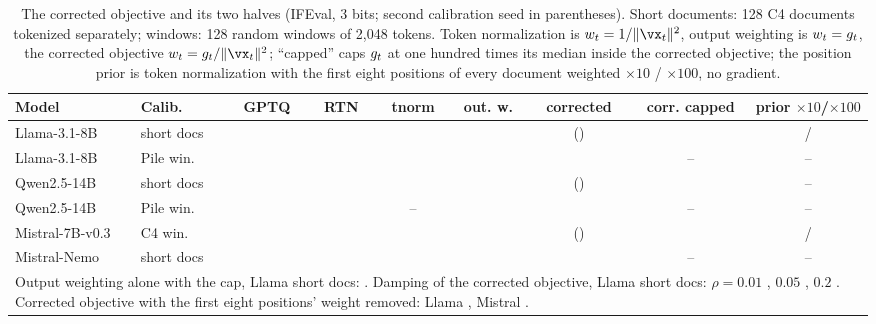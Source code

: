 \begin{table}[htbp]
\caption{The corrected objective and its two halves (IFEval, 3 bits; second calibration seed in parentheses). Short documents: 128 C4 documents tokenized separately; windows: 128 random windows of 2,048 tokens. Token normalization is $\wtok=1/\|\vx_t\|^2$, output weighting is $w_t=g_t$, the corrected objective $\wtok=\gsens/\|\vx_t\|^2$; ``capped'' caps $g_t$ at one hundred times its median inside the corrected objective; the position prior is token normalization with the first eight positions of every document weighted $\times10$ / $\times100$, no gradient.}
\label{tab:ablation_full}
\begin{center}
\footnotesize
\setlength{\tabcolsep}{3pt}
\begin{tabular}{llccccccc}
\toprule
Model & Calib. & GPTQ & RTN & tnorm & out. w. & corrected & corr. capped & prior $\times10$/$\times100$ \\
\midrule
Llama-3.1-8B    & short docs & \LgptqIF{} & \LrtnIF{} & \LtnormIF{}     & \LgonlyIF{}     & \LcorrIF{} (\LcorrSeedIF{}) & \LcorrCapIF{} & \PosWtenIF{}/\PosWhundredIF{} \\
Llama-3.1-8B    & Pile win.  & \LpileIF{} & \LrtnIF{} & \LpileTnormIF{} & \LpileGonlyIF{} & \LpileCorrIF{}              & --            & -- \\
Qwen2.5-14B     & short docs & \QgptqIF{} & \QrtnIF{} & \QtnormIF{}     & \QgonlyIF{}     & \QcorrIF{} (\QcorrSeedIF{}) & \QcorrCapIF{} & -- \\
Qwen2.5-14B     & Pile win.  & \QpileIF{} & \QrtnIF{} & --              & \QpileGonlyIF{} & \QpileCorrIF{}              & --            & -- \\
Mistral-7B-v0.3 & C4 win.    & \MgptqIF{} & \MrtnIF{} & \MtnormIF{}     & \MgonlyIF{}     & \McorrIF{} (\McorrSeedIF{}) & \McorrCapIF{} & \MposTenIF{}/\MposHundredIF{} \\
Mistral-Nemo    & short docs & \NgptqIF{} & \NrtnIF{} & \NtnormIF{}     & \NgonlyIF{}     & \NcorrIF{}                  & --            & -- \\
\midrule
\multicolumn{9}{p{12.6cm}}{Output weighting alone with the cap, Llama short docs: \LcapIF{}. Damping of the corrected objective, Llama short docs: $\rho=0.01$ \CorrRhoLow{}, $0.05$ \LcorrIF{}, $0.2$ \CorrRhoHigh{}. Corrected objective with the first eight positions' weight removed: Llama \CorrPosDropIF{}, Mistral \McorrPosDropIF{}.} \\
\bottomrule
\end{tabular}
\end{center}
\end{table}
